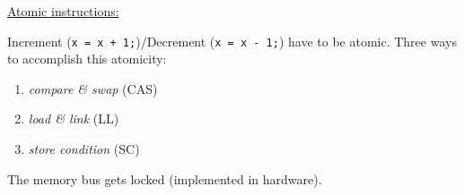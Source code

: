 


\par{
	\noindent\underline{Atomic instructions:}
	\par{
		\noindent
		Increment (\texttt{x = x + 1;})/Decrement (\texttt{x = x - 1;}) have to be atomic. Three ways to accomplish this atomicity:
		\parskip0pt\begin{enumerate}
			\item{\textit{compare \& swap} (CAS)}
			\item{\textit{load \& link} (LL)}
			\item{\textit{store condition} (SC)}
		\end{enumerate}
		The memory bus gets locked (implemented in hardware).
	}
}
